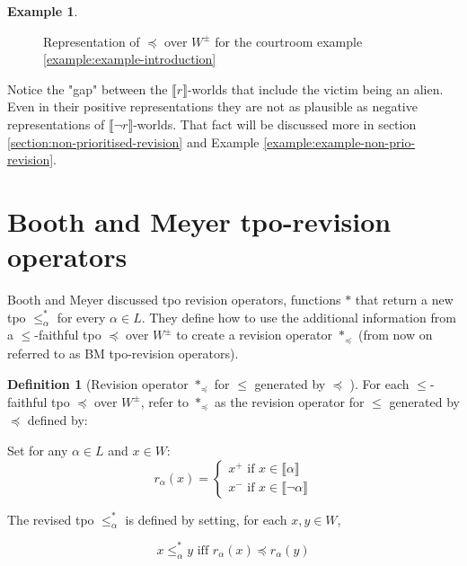 \documentclass[english, 12pt]{scrartcl}
\theoremstyle{definition}
\newtheorem{example}{Example}
\theoremstyle{definition}
\newtheorem{definition}{Definition}
\theoremstyle{definition}
\newcommand{\modelsOf}[1]{\llbracket #1 \rrbracket}
\begin{document}
\begin{example}
\begin{figure}[H]
            \caption{Representation of $\preceq$ over $W^{\pm}$ for the courtroom example \ref{example:example-introduction}}
            \label{fig:example-tpo-initial}
    \end{figure}
    
    Notice the "gap" between the $\modelsOf{r}$-worlds that include the victim being an alien. Even in their positive representations they are not as plausible as negative representations of $\modelsOf{\neg r}$-worlds. That fact will be discussed more in section \ref{section:non-prioritised-revision} and Example \ref{example:example-non-prio-revision}.
\end{example}

\section{Booth and Meyer tpo-revision operators}
\label{section:booth-and-meyer-tpo-revision-operators}
Booth and Meyer \cite{Booth2011} discussed tpo revision operators, functions $\ast$ that return a new tpo $\leq_{\alpha}^{\ast}$ for every $\alpha \in L$. They define how to use the additional information from a $\leq$-faithful tpo $\preceq$ over $W^{\pm}$ to create a revision operator $\ast_{\preceq}$ (from now on referred to as BM tpo-revision operators).

\begin{definition}[Revision operator $\ast_{\preceq}$ for $\leq$ generated by $\preceq$ \cite{Booth2011}]
    \label{definition:revision-operator}
    For each $\leq$-faithful tpo $\preceq$ over $W^{\pm}$, refer to $\ast_{\preceq}$ as the revision operator for $\leq$ generated by $\preceq$ defined by:
    
    Set for any $\alpha \in L$ and $x \in W$:
    \begin{equation*}
        r_{\alpha}(x) = \left\{
                    \begin{array}{ll}
                      x^{+} \textrm{ if } x \in \modelsOf{\alpha}\\
                      x^{-} \textrm{ if } x \in \modelsOf{\neg\alpha}
                    \end{array}
                  \right.
    \end{equation*}
    
    The revised tpo $\leq_{\alpha}^{\ast}$ is defined by setting, for each $x, y \in W$,

    \begin{equation*}
        x \leq_{\alpha}^{\ast} y \textrm{ iff } r_{\alpha}(x) \preceq r_{\alpha}(y)
    \end{equation*}
\end{definition}
\end{document}
